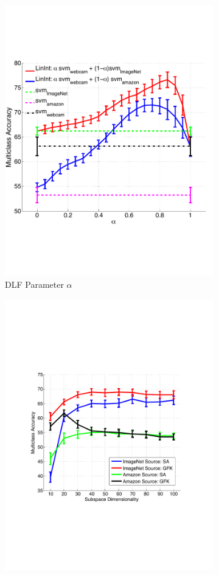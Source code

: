 \begin{figure}
\centering
\begin{subfigure}[b]{0.29\textwidth}
\centering
\includegraphics[height=\textwidth]{figs/amazonAndImagenet-linint-vs-alpha_C1_fc8.pdf}
\caption{DLF Parameter $\alpha$}
\label{fig:linint-eval}
\end{subfigure}
%
\hfill
\begin{subfigure}[b]{0.29\textwidth}
\centering
\includegraphics[height=\linewidth]{figs/amazonAndImagenet-sa_gfk_dim_C1_fc7.pdf}

\end{subfigure}
\end{figure}
